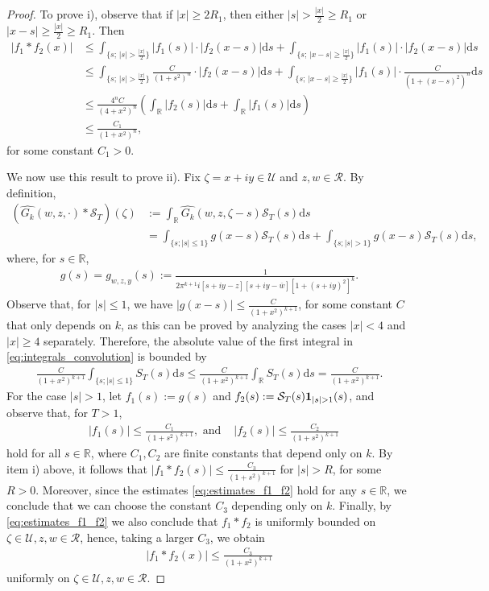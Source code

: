 \documentclass[a4paper,reqno,12pt]{amsart}
\newcommand{\R}{\mathcal{R}}
\renewcommand{\S}{\mathcal{S}}
\newcommand{\U}{\mathcal{U}}
\renewcommand{\r}{\mathbb{R}}
\newcommand{\ft}{\widehat}
\renewcommand{\d}{\mathrm{d}}
\newcommand{\ov}[1]{\overline{#1}}
\newcommand{\cd}{\cdot}
\newcommand{\1}{{\bf 1}}
\begin{document}
\begin{proof}
    To prove i), observe that if $|x|\geq 2R_1$, then either $|s|>\frac{|x|}{2}\geq R_1$ or $|x-s|\geq\frac{|x|}{2}\geq R_1$. Then
\begin{align*}
    \left|f_1*f_2(x)\right|&\leq \int_{\{s;\,|s|>\frac{|x|}{2}\}} |f_1(s)|\cd|f_2(x-s)|\d s +\int_{\{s;\,|x-s|\geq\frac{|x|}{2}\}} |f_1(s)|\cd|f_2(x-s)|\d s\\
    &\leq\int_{\{s;\,|s|>\frac{|x|}{2}\}} \frac{C}{(1+s^2)^n}\cd|f_2(x-s)|\d s +\int_{\{s;\,|x-s|\geq\frac{|x|}{2}\}} |f_1(s)|\cd\frac{C}{(1+(x-s)^2)^n}\d s\\
    &\leq \frac{4^n C}{(4+x^2)^n}\left(\int_{\r} |f_2(s)|\d s +\int_{\r} |f_1(s)|\d s\right)\\
    &\leq \frac{C_1}{(1+x^2)^n},
\end{align*}
for some constant $C_1>0$.

We now use this result to prove ii). Fix $\zeta=x+iy\in \U$ and $z,w\in\R$. By definition,
\begin{align}
\label{eq:integrals_convolution}
    \left(\ft{G_k}(w,z,\cd)*\S_T\right)(\zeta)&:=\int_{\r} \ft{G_k}(w,z,\zeta-s)\S_T(s)\d s\\
    &=\int_{\{s;|s|\leq1\}} g(x-s)\S_T(s)\d s+\int_{\{s;|s|>1\}} g(x-s)\S_T(s)\d s,
\end{align}
where, for $s\in\r$,
\begin{align*}
    g(s)=g_{w,z,y}(s):=\frac{1}{2\pi^{k+1}i[s+iy-z][s+iy-\ov{w}][1+(s+iy)^2]^k}.
\end{align*}
Observe that, for $|s|\leq1$, we have $|g(x-s)|\leq\frac{C}{(1+x^2)^{k+1}}$, for some constant $C$ that only depends on $k$, as this can be proved by analyzing the cases $|x|<4$ and $|x|\geq4$ separately. Therefore, the absolute value of the first integral in \eqref{eq:integrals_convolution} is bounded by
\begin{align*}
    \frac{C}{(1+x^2)^{k+1}}\int_{\{s;|s|\leq1\}} S_T(s)\d s\leq \frac{C}{(1+x^2)^{k+1}}\int_{\r} S_T(s)\d s=\frac{C}{(1+x^2)^{k+1}}.
\end{align*}
For the case $|s|>1$, let $f_1(s):=g(s)$ and $f_2(s):=\S_T(s)\1_{|s|>1}(s)$, and observe that, for $T>1$, 
\begin{align}
\label{eq:estimates_f1_f2}
    &|f_1(s)|\leq \frac{C_1}{(1+s^2)^{k+1}},  \text{ and } & |f_2(s)|\leq \frac{C_2}{(1+s^2)^{k+1}}
\end{align}
hold for all $s\in\r$, where $C_1,C_2$ are finite constants that depend only on $k$. By item i) above, it follows that $|f_1*f_2(s)|\leq\frac{C_3}{(1+s^2)^{k+1}}$ for $|s|>R$, for some $R>0$. Moreover, since the estimates \eqref{eq:estimates_f1_f2} hold for any $s\in\r$, we conclude that we can choose the constant $C_3$ depending only on $k$. Finally, by \eqref{eq:estimates_f1_f2} we also conclude that $f_1*f_2$ is uniformly bounded on $\zeta\in\U,z,w\in\R$, hence, taking a larger $C_3$, we obtain 
\begin{align*}
    |f_1*f_2(x)|\leq\frac{C_3}{(1+x^2)^{k+1}}
\end{align*}
uniformly on $\zeta\in\U, z,w\in\R$.
\end{proof}
\end{document}
